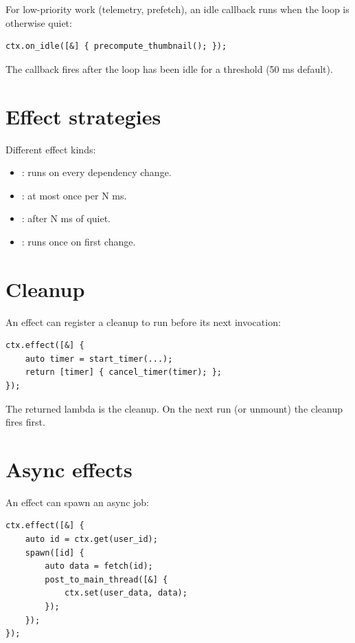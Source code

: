 For low-priority work (telemetry, prefetch), an idle
callback runs when the loop is otherwise quiet:

\begin{lstlisting}
ctx.on_idle([&] { precompute_thumbnail(); });
\end{lstlisting}

The callback fires after the loop has been idle for a
threshold (50 ms default).

\section{Effect strategies}

Different effect kinds:

\begin{itemize}[leftmargin=*]
  \item {}: runs on every dependency change.
  \item {}: at most once per N ms.
  \item {}: after N ms of quiet.
  \item {}: runs once on first change.
\end{itemize}

\section{Cleanup}

An effect can register a cleanup to run before its next
invocation:

\begin{lstlisting}
ctx.effect([&] {
    auto timer = start_timer(...);
    return [timer] { cancel_timer(timer); };
});
\end{lstlisting}

The returned lambda is the cleanup. On the next run (or
unmount) the cleanup fires first.

\section{Async effects}

An effect can spawn an async job:

\begin{lstlisting}
ctx.effect([&] {
    auto id = ctx.get(user_id);
    spawn([id] {
        auto data = fetch(id);
        post_to_main_thread([&] {
            ctx.set(user_data, data);
        });
    });
});
\end{lstlisting}

